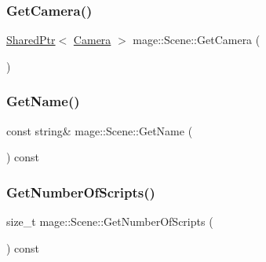 \hypertarget{classmage_1_1_scene_a8845b10d7c51aa8ba824b694556ca84d}{}\label{classmage_1_1_scene_a8845b10d7c51aa8ba824b694556ca84d} 
\subsubsection{\texorpdfstring{Get\+Camera()}{GetCamera()}}
{\footnotesize\ttfamily \hyperlink{namespacemage_a1e01ae66713838a7a67d30e44c67703e}{Shared\+Ptr}$<$ \hyperlink{classmage_1_1_camera}{Camera} $>$ mage\+::\+Scene\+::\+Get\+Camera (\begin{DoxyParamCaption}{ }\end{DoxyParamCaption})}

\hypertarget{classmage_1_1_scene_a251ff8f6ce0da5c55ee31e3450b5fb9a}{}\label{classmage_1_1_scene_a251ff8f6ce0da5c55ee31e3450b5fb9a} 
\subsubsection{\texorpdfstring{Get\+Name()}{GetName()}}
{\footnotesize\ttfamily const string\& mage\+::\+Scene\+::\+Get\+Name (\begin{DoxyParamCaption}{ }\end{DoxyParamCaption}) const}

\hypertarget{classmage_1_1_scene_a799ac8ddd90d24f6c3c208942e4f159c}{}\label{classmage_1_1_scene_a799ac8ddd90d24f6c3c208942e4f159c} 
\subsubsection{\texorpdfstring{Get\+Number\+Of\+Scripts()}{GetNumberOfScripts()}}
{\footnotesize\ttfamily size\+\_\+t mage\+::\+Scene\+::\+Get\+Number\+Of\+Scripts (\begin{DoxyParamCaption}{ }\end{DoxyParamCaption}) const}

\hypertarget{classmage_1_1_scene_abade558e953a062b5040f48d8e7371f4}{}\label{classmage_1_1_scene_abade558e953a062b5040f48d8e7371f4} 
